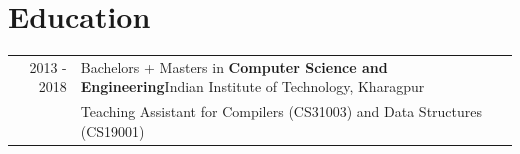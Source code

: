 \documentclass[a4paper,10pt]{extarticle} %
\begin{document}
\vspace{-2.3em}

\section{\textcolor{primary}{Education}}
\begin{tabularx}{\linewidth}{r|X}
\textsc{\hspace{0.3em}2013 - 2018} & Bachelors + Masters in \textbf{Computer Science and Engineering}\hspace{2.1em}\raisebox{-.2\height}{}\hspace{0.3em}Indian Institute of Technology, Kharagpur\\
&Teaching Assistant for Compilers (CS31003) and Data Structures (CS19001)\\
\end{tabularx}


\end{document}
